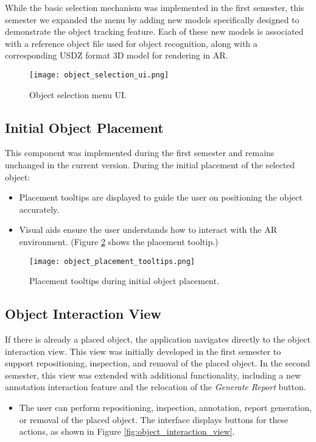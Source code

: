 While the basic selection mechanism was implemented in the first semester, this semester we expanded the menu by adding new models specifically designed to demonstrate the object tracking feature. Each of these new models is associated with a reference object file used for object recognition, along with a corresponding USDZ format 3D model for rendering in AR.

\begin{figure}[h!]
    \centering
    \texttt{[image: object\_selection\_ui.png]} %
    \caption{Object selection menu UI.}
    \label{fig:ui_object_selection}
\end{figure}

\subsection{Initial Object Placement}
This component was implemented during the first semester and remains unchanged in the current version. During the initial placement of the selected object:
\begin{itemize}
    \item Placement tooltips are displayed to guide the user on positioning the object accurately.
    \item Visual aids ensure the user understands how to interact with the AR environment. (Figure \ref{fig:ui_initial_placement} shows the placement tooltip.)
\end{itemize}
\begin{figure}[H]
    \centering
    \texttt{[image: object\_placement\_tooltips.png]} %
    \caption{Placement tooltips during initial object placement.}
    \label{fig:ui_initial_placement}
\end{figure}

\subsection{Object Interaction View}
If there is already a placed object, the application navigates directly to the object interaction view. This view was initially developed in the first semester to support repositioning, inspection, and removal of the placed object. In the second semester, this view was extended with additional functionality, including a new annotation interaction feature and the relocation of the \textit{Generate Report} button.

\begin{itemize}
    \item The user can perform repositioning, inspection, annotation, report generation, or removal of the placed object. The interface displays buttons for these actions, as shown in Figure \ref{fig:object_interaction_view}.
\end{itemize}

